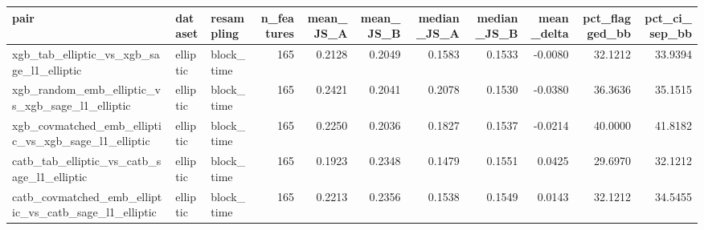 \begin{tabular}{lllrrrrrrrr}
\toprule
pair & dataset & resampling & n\_features & mean\_JS\_A & mean\_JS\_B & median\_JS\_A & median\_JS\_B & mean\_delta & pct\_flagged\_bb & pct\_ci\_sep\_bb \\
\midrule
xgb\_tab\_elliptic\_vs\_xgb\_sage\_l1\_elliptic & elliptic & block\_time & 165 & 0.2128 & 0.2049 & 0.1583 & 0.1533 & -0.0080 & 32.1212 & 33.9394 \\
xgb\_random\_emb\_elliptic\_vs\_xgb\_sage\_l1\_elliptic & elliptic & block\_time & 165 & 0.2421 & 0.2041 & 0.2078 & 0.1530 & -0.0380 & 36.3636 & 35.1515 \\
xgb\_covmatched\_emb\_elliptic\_vs\_xgb\_sage\_l1\_elliptic & elliptic & block\_time & 165 & 0.2250 & 0.2036 & 0.1827 & 0.1537 & -0.0214 & 40.0000 & 41.8182 \\
catb\_tab\_elliptic\_vs\_catb\_sage\_l1\_elliptic & elliptic & block\_time & 165 & 0.1923 & 0.2348 & 0.1479 & 0.1551 & 0.0425 & 29.6970 & 32.1212 \\
catb\_covmatched\_emb\_elliptic\_vs\_catb\_sage\_l1\_elliptic & elliptic & block\_time & 165 & 0.2213 & 0.2356 & 0.1538 & 0.1549 & 0.0143 & 32.1212 & 34.5455 \\
\bottomrule
\end{tabular}
